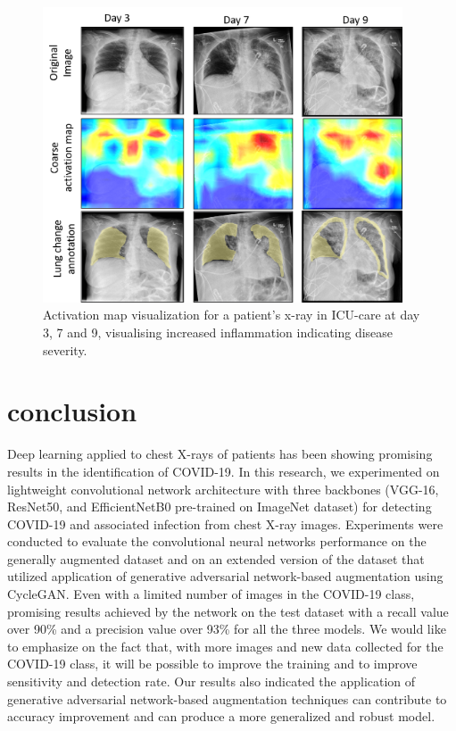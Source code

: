 \begin{figure}[h!]
\centering
\includegraphics[width=0.95\textwidth]{images/Picture2_activation map.png}
   \caption{Activation map visualization for a patient's x-ray in ICU-care at day 3, 7 and 9, visualising increased inflammation indicating disease severity.}
\label{fig:activation_map}
\end{figure}

\section{conclusion}
\label{sec:conclusion}
 Deep learning applied to chest X-rays of patients has been showing promising results in the identification of COVID-19. In this research, we experimented on lightweight convolutional network architecture with three backbones (VGG-16, ResNet50, and EfficientNetB0 pre-trained on ImageNet dataset) for detecting COVID-19 and associated infection from chest X-ray images. Experiments were conducted to evaluate the convolutional neural networks performance on the generally augmented dataset and on an extended version of the dataset that utilized application of generative adversarial network-based augmentation using CycleGAN.  Even with a limited number of images in the COVID-19 class, promising results achieved by the network on the test dataset with a recall value over 90\% and a precision value over 93\% for all the three models. We would like to emphasize on the fact that, with more images and new data collected for the COVID-19 class, it will be possible to improve the training and to improve sensitivity and detection rate. Our results also indicated the application of generative adversarial network-based augmentation techniques can contribute to accuracy improvement and can produce a more generalized and robust model.


